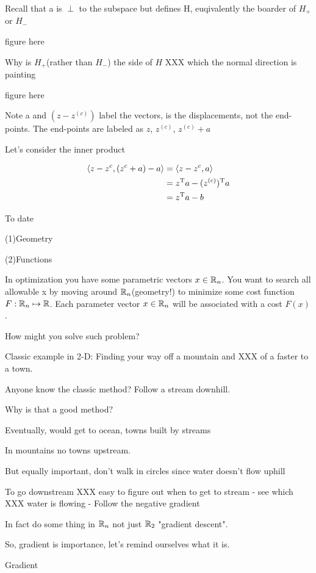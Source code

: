 Recall that a is $\perp$ to the subspace but defines H, euqivalently the boarder of $H_{+}$ or $H_{-}$

figure here

Why is $H_{+}$(rather than $H_{-}$) the side of $H$ XXX which the normal direction is painting

figure here

Note a and $(z-z^{(c)})$ label the vectors, is the displacements, not the end-points. The end-points are labeled as $z$, $z^{(c)}$, $z^{(c)}+a$

Let's consider the inner product

\begin{align*}
\langle z-z^{c},(z^{c}+a)-a\rangle&=\langle z-z^{c},a\rangle\\
&=z^{{\rm T}} a -(z^{(c)})^{{\rm T}} a\\
&=z^{{\rm T}}a-b
\end{align*}

\vspace{0.5cm}
To date

(1)Geometry

(2)Functions

In optimization you have some parametric vectors $x\in\mathbb{R}_{n}$. You want to search all allowable x by moving around $\mathbb{R}_{n}$(geometry!) to minimize some cost function $F:\mathbb{R}_{n}\mapsto\mathbb{R}$. Each parameter vector $x\in\mathbb{R}_{n}$ will be associated with a cost $F(x)$.

How might you solve such problem?

Classic example in 2-D: Finding your way off a mountain and XXX of a faster to a town.

Anyone know the classic method? Follow a stream downhill.

Why is that a good method?

Eventually, would get to ocean, towns built by streams

In mountains no towns upstream.

But equally important, don't walk in circles since water doesn't flow uphill


To go downstream XXX easy to figure out when to get to stream - see which XXX water is flowing - Follow the negative gradient

In fact do some thing in $\mathbb{R}_{n}$ not just $\mathbb{R}_{2}$ "gradient descent".

So, gradient is importance, let's remind ourselves what it is.


Gradient

